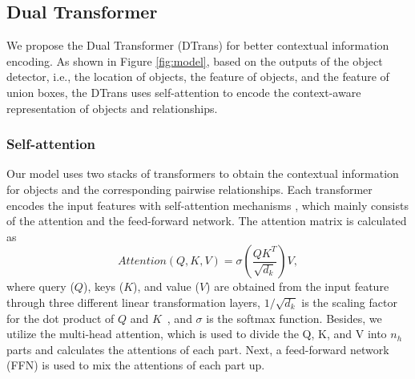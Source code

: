 \subsection{Dual Transformer}
\label{sec:DTrans}
We propose the Dual Transformer (DTrans) for better contextual information encoding. As shown in Figure \ref{fig:model}, based on the outputs of the object detector, i.e., the location of objects, the feature of objects, and the feature of union boxes, the DTrans uses self-attention to encode the context-aware representation of objects and relationships.
%

\subsubsection{Self-attention}
Our model uses two stacks of transformers to obtain the contextual information for objects and the corresponding pairwise relationships. Each transformer encodes the input features with self-attention mechanisms \cite{vaswani2017attention}, which mainly consists of the attention and the feed-forward network. The attention matrix is calculated as
\begin{equation}
	Attention(Q,K,V) = \sigma(\frac{QK^T}{\sqrt{d_k}})V,
\end{equation}
where query ($Q$), keys ($K$), and value ($V$) are obtained from the input feature through three different linear transformation layers, $1/\sqrt{d_k}$ is the scaling factor for the dot product of $Q$ and $K$~\cite{vaswani2017attention}, and $\sigma$ is the softmax function. Besides, we utilize the multi-head attention, which is used to divide the Q, K, and V into $n_h$ parts and calculates the attentions of each part. Next, a feed-forward network (FFN) is used to mix the attentions of each part up.

